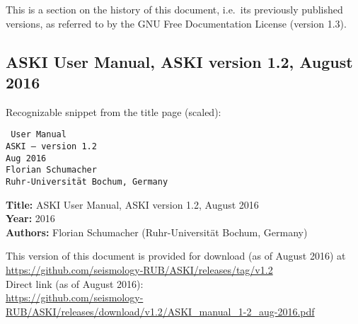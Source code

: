 
%
%
%
This is a section on the history of this document, i.e.\ its previously published versions, as referred to by
the GNU Free Documentation License (version 1.3).

\subsection*{ASKI User Manual, ASKI version 1.2, August 2016}

Recognizable snippet from the title page (scaled):

\begin{minipage}{0.45\textwidth}
  \begin{flushright} \tt
      {\LARGE User Manual} \\[1em]
      {\large ASKI} {\rm --} version 1.2 \\[1em]
      Aug 2016 \\
      Florian Schumacher \\ 
      {\footnotesize Ruhr-Universit\"at Bochum, Germany}
  \end{flushright}
\end{minipage}
\vspace*{1ex}

{\bf Title: } ASKI User Manual, ASKI version 1.2, August 2016\\
{\bf Year: } 2016\\
{\bf Authors: } Florian Schumacher (Ruhr-Universit\"at Bochum, Germany)

This version of this document is provided for download (as of August 2016) at\\
\url{https://github.com/seismology-RUB/ASKI/releases/tag/v1.2}\\
Direct link (as of August 2016):\\
\url{https://github.com/seismology-RUB/ASKI/releases/download/v1.2/ASKI_manual_1-2_aug-2016.pdf}



